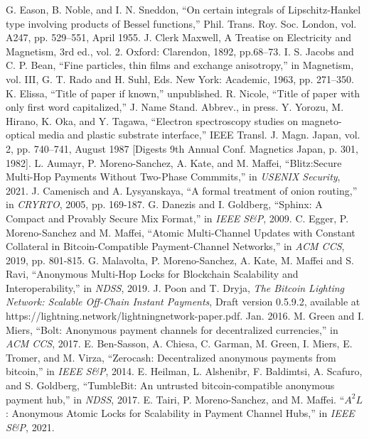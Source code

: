\documentclass[conference]{IEEEtran}
\begin{document}
\begin{thebibliography}{99}
 G. Eason, B. Noble, and I. N. Sneddon, ``On certain integrals of Lipschitz-Hankel type involving products of Bessel functions,'' Phil. Trans. Roy. Soc. London, vol. A247, pp. 529--551, April 1955.
 J. Clerk Maxwell, A Treatise on Electricity and Magnetism, 3rd ed., vol. 2. Oxford: Clarendon, 1892, pp.68--73.
 I. S. Jacobs and C. P. Bean, ``Fine particles, thin films and exchange anisotropy,'' in Magnetism, vol. III, G. T. Rado and H. Suhl, Eds. New York: Academic, 1963, pp. 271--350.
 K. Elissa, ``Title of paper if known,'' unpublished.
 R. Nicole, ``Title of paper with only first word capitalized,'' J. Name Stand. Abbrev., in press.
 Y. Yorozu, M. Hirano, K. Oka, and Y. Tagawa, ``Electron spectroscopy studies on magneto-optical media and plastic substrate interface,'' IEEE Transl. J. Magn. Japan, vol. 2, pp. 740--741, August 1987 [Digests 9th Annual Conf. Magnetics Japan, p. 301, 1982].
 L. Aumayr, P. Moreno-Sanchez, A. Kate, and M. Maffei, ``Blitz:Secure Multi-Hop Payments Without Two-Phase Commmits,'' in \textit{USENIX Security}, 2021.
 J. Camenisch and A. Lysyanskaya, ``A formal treatment of onion routing,'' in \textit{CRYRTO}, 2005, pp. 169-187. 
 G. Danezis and I. Goldberg, ``Sphinx: A Compact and Provably Secure Mix Format,'' in \textit{IEEE S\&P}, 2009. 
 C. Egger, P. Moreno-Sanchez and M. Maffei, ``Atomic Multi-Channel Updates with Constant Collateral in Bitcoin-Compatible Payment-Channel Networks,'' in \textit{ACM CCS}, 2019, pp. 801-815.
 G. Malavolta, P. Moreno-Sanchez, A. Kate, M. Maffei and S. Ravi, ``Anonymous Multi-Hop Locks for Blockchain Scalability and Interoperability,'' in \textit{NDSS}, 2019.
 J. Poon and T. Dryja, \textit{The Bitcoin Lighting Network: Scalable Off-Chain Instant Payments}, Draft version 0.5.9.2, available at https://lightning.network/lightningnetwork-paper.pdf. Jan. 2016. 
 M. Green and I. Miers, ``Bolt: Anonymous payment channels for decentralized currencies,'' in \textit{ACM CCS}, 2017. 
 E. Ben-Sasson, A. Chiesa, C. Garman, M. Green, I. Miers, E. Tromer, and M. Virza, ``Zerocash: Decentralized anonymous payments from bitcoin,'' in \textit{IEEE S\&P}, 2014.
 E. Heilman, L. Alshenibr, F. Baldimtsi, A. Scafuro, and S. Goldberg, ``TumbleBit: An untrusted bitcoin-compatible anonymous payment hub,'' in \textit{NDSS}, 2017.
 E. Tairi, P. Moreno-Sanchez, and M. Maffei. ``$A^{2}L$: Anonymous Atomic Locks for Scalability in Payment Channel Hubs,'' in \textit{IEEE S\&P}, 2021.

\end{thebibliography}
\end{document}
